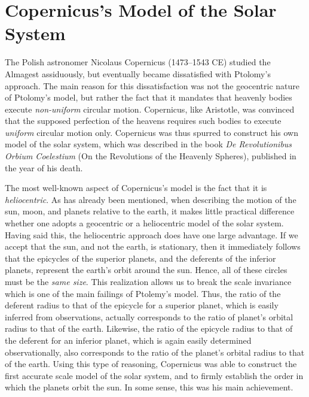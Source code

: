 \section{Copernicus's Model of the Solar System}
The Polish astronomer Nicolaus Copernicus (1473--1543 CE) studied the
Almagest assiduously, but eventually became dissatisfied with
Ptolomy's approach. The main reason for this dissatisfaction was
not the geocentric nature of Ptolomy's model, but rather the fact that it
mandates that heavenly bodies  execute {\em non-uniform}\/ circular
motion. Copernicus, like Aristotle, was convinced that the supposed perfection
of the heavens requires  such bodies to execute {\em uniform}\/ circular motion only. Copernicus was thus spurred to construct his own
model of the solar system, which was described in the book {\em De Revolutionibus Orbium Coelestium} (On the Revolutions of the Heavenly Spheres), published in the year of his death.

The most well-known aspect of Copernicus's model is the fact that it
is {\em heliocentric}. As has already been mentioned, when describing
the motion of the sun, moon, and planets relative to the earth, it makes
little practical difference whether one adopts a geocentric or a heliocentric
model of the solar system. Having said this, the heliocentric approach does have one large advantage. If we accept that the sun,  and not the earth,
is stationary, then it immediately follows that the epicycles of the
superior planets, and the deferents of the inferior planets,  represent the earth's orbit around the sun. Hence, all of these circles
must be the {\em same size}. This realization allows us to break the
scale invariance which is one of the main failings of Ptolemy's
model. Thus, the ratio of the deferent radius to that of the
epicycle for a superior planet, which is easily inferred from observations,
actually corresponds to the ratio of planet's orbital radius to that of the
earth. Likewise, the ratio of the epicycle radius to that of the deferent
for an inferior planet, which is again easily determined observationally, also corresponds to the ratio of the planet's
orbital radius to that of the earth. Using this type of reasoning,
Copernicus was able to construct the first accurate scale model
of the solar system, and to firmly establish the order in which the planets
orbit the sun. In some sense, this was his main achievement.


